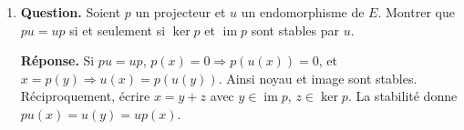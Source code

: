 \documentclass[12pt, a4paper]{article}
\begin{document}
\begin{enumerate}[label=7.\arabic*., start=68]
\begin{minipage}[t]{\linewidth}
\begin{enumerate}[\arabic*.]
        \item \textbf{Question.} Donner une base de $\operatorname{im}a$ et de $\ker a$.
\par\smallskip
\textbf{Réponse.} Posons $r=(1,1,1,1)^\top$, $s=(1,0,0,1)^\top$,
    $k_1=(1,0,0,-1)^\top$, $k_2=(0,1,-1,0)^\top$.

$\operatorname{im}a=\operatorname{Vect}(r,s)$ et $\ker a=\operatorname{Vect}(k_1,k_2)$.

  \item \textbf{Question.} Montrer que $\operatorname{im}a$ est stable par $a$.
\par\smallskip
\textbf{Réponse.} L'image de tout endomorphisme est stable : $a(a(x))\in\operatorname{im}a$.

  \item \textbf{Question.} Donner la matrice de $\varphi=a|_{\operatorname{im}a}$ dans une base de l’image.
\par\smallskip
\textbf{Réponse.} Dans $(r,s)$, $a(r)=2r+2s$ et $a(s)=2r$, donc $[\varphi]=\begin{pmatrix}2&2\\2&0\end{pmatrix}$.

  \item \textbf{Question.} Montrer que $A$ est semblable à $\operatorname{diag}\left(0_2,\begin{pmatrix}2&2\\2&0\end{pmatrix}\right)$.
\par\smallskip
\textbf{Réponse.} $(k_1,k_2,r,s)$ est une base (l'intersection noyau-image est nulle).
        La matrice dans cette base est exactement $B$.

\end{enumerate}
\end{minipage}

  \item \begin{minipage}[t]{\linewidth}\raggedright
\textbf{Question.} Soient $p$ un projecteur et $u$ un endomorphisme de $E$. Montrer que $pu=up$ si et seulement si $\ker p$ et $\operatorname{im}p$ sont stables par $u$.
\par\smallskip
\textbf{Réponse.} Si $pu=up$, $p(x)=0\Rightarrow p(u(x))=0$, et $x=p(y)\Rightarrow u(x)=p(u(y))$.
    Ainsi noyau et image sont stables.
    Réciproquement, écrire $x=y+z$ avec $y\in\operatorname{im}p$, $z\in\ker p$.
    La stabilité donne $pu(x)=u(y)=up(x)$.
\end{minipage}


\end{enumerate}
\end{document}
